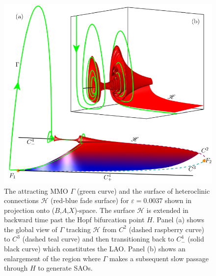 \documentclass{ws-ijbc}
\begin{document}
\begin{figure}[H]
\centering
\includegraphics[]{./figures/MKMO_14.pdf}
\caption{The attracting MMO $\Gamma$ (green curve) and the surface of heteroclinic connections $\mathscr{H}$ (red-blue fade surface) for $\varepsilon=0.0037$ shown in projection onto ($B$,$A$,$X$)-space. The surface $\mathscr{H}$ is extended in backward time past the Hopf bifurcation point $H$.  Panel (a) shows the global view of $\Gamma$ tracking $\mathscr{H}$ from $C^2$ (dashed raspberry curve) to $C^3$ (dashed teal curve) and then transitioning back to $C^4_-$ (solid black curve) which constitutes the LAO.  Panel (b) shows an enlargement of the region where $\Gamma$ makes a subsequent slow passage through $H$ to generate SAOs.}
\label{figure_14}
\end{figure}
\end{document}
